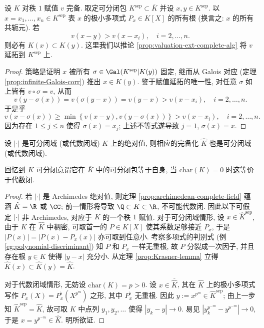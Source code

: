 \begin{theorem}[M.\ Krasner]\label{prop:Krasner-lemma}
	设 $K$ 对秩 $1$ 赋值 $v$ 完备. 取定可分闭包 $K^\mathrm{sep} \subset \overline{K}$ 并设 $x, y \in K^\mathrm{sep}$. 以 $x = x_1, \ldots, x_n \in K^\mathrm{sep}$ 表 $x$ 的极小多项式 $P_x \in K[X]$ 的所有根 (换言之: $x$ 的所有共轭元). 若
	\[ v(x-y) > v(x-x_i), \quad i=2, \ldots, n. \]
	则必有 $K(x) \subset K(y)$. 这里我们以推论 \ref{prop:valuation-ext-complete-alg} 将 $v$ 延拓到 $K^\mathrm{sep}$ 上.
\end{theorem}
\begin{proof}
	策略是证明 $x$ 被所有 $\sigma \in \Gal(K^\text{sep}|K(y))$ 固定, 继而从 Galois 对应 (定理 \ref{prop:infinite-Galois-corr}) 推出 $x \in K(y)$. 鉴于赋值延拓的唯一性, 对任意 $\sigma$ 如上皆有 $v \circ \sigma = v$, 从而
	\[ v(y-\sigma(x)) = v(\sigma(y-x)) = v(y-x) > v(x-x_i), \quad i=2, \ldots, n. \]
	于是乎
	\[ v(x-\sigma(x)) \geq \min\left\{ v(x-y), v(y-\sigma(x)) \right\}  > v(x-x_i), \quad i=2, \ldots, n. \]
	因为存在 $1 \leq j \leq n$ 使得 $\sigma(x) = x_j$; 上述不等式遂导致 $j=1$, $\sigma(x)=x$.
\end{proof}

\begin{corollary}\label{prop:complete-alg-closed}
	设 $|\cdot|$ 是可分闭域 (或代数闭域) $K$ 上的绝对值, 则相应的完备化 $\hat{K}$ 也是可分闭域 (或代数闭域).
\end{corollary}
回忆到 $K$ 可分闭意谓它在 $\overline{K}$ 中的可分闭包等于自身, 当 $\text{char}(K)=0$ 时这等价于代数闭.

\begin{proof}
	若 $|\cdot|$ 是 Archimedes 绝对值, 则定理 \ref{prop:archimedean-complete-field} 蕴涵 $\hat{K}=\R$ 或 $\CC$; 前一情形将导致 $\Q \subset K \subset \R$, 不可能代数闭. 因此以下可假定 $|\cdot|$ 非 Archimedes, 对应于 $K$ 的一个秩 $1$ 赋值. 对于可分闭域情形, 设 $x \in \hat{K}^{\text{sep}}$, 由于 $K$ 在 $\hat{K}$ 中稠密, 可取首一的 $P \in K[X]$ 使其系数足够接近 $P_x$, 于是 $|P(x)|=|P(x)-P_x(x)|$ 亦可取到任意小. 考察多项式的判别式 (例 \ref{eg:polynomial-discriminant}) 知 $P$ 和 $P_x$ 一样无重根, 故 $P$ 分裂成一次因子, 并且存在根 $y \in K$ 使得 $|y-x|$ 充分小. 从定理 \ref{prop:Krasner-lemma} 立得 $\hat{K}(x) \subset \hat{K}(y) = \hat{K}$.
	
	对于代数闭域情形, 无妨设 $\text{char}(K) = p > 0$. 设 $x \in \overline{\hat{K}}$, 其在 $\hat{K}$ 上的极小多项式写作 $P_x(X) = P_x^\flat(X^{p^m})$ 之形, 其中 $P_x^\flat$ 无重根. 因此 $y := x^{p^m} \in \hat{K}^{\text{sep}}$; 由上一步知 $\hat{K}^{\text{sep}} = \hat{K}$, 故可取 $K$ 中点列 $y_1, y_2, \ldots$ 使得 $|y_k - y| \to 0$. 易见 $\left| y_k^{p^{-m}} - y^{p^{-m}} \right| \to 0$, 于是 $x = y^{p^{-m}} \in \hat{K}$. 明所欲证.
\end{proof}

